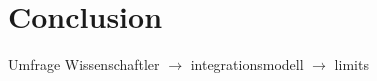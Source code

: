 \section{Conclusion}
\label{sec:Conclusion}


Umfrage Wissenschaftler \(\to\) integrationsmodell \(\to\) limits
